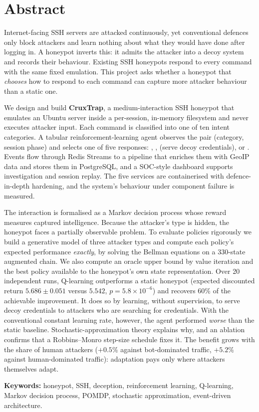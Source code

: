 \chapter*{Abstract}
Internet-facing SSH servers are attacked continuously, yet conventional defences only block
attackers and learn nothing about what they would have done after logging in. A honeypot
inverts this: it admits the attacker into a decoy system and records their behaviour.
Existing SSH honeypots respond to every command with the same fixed emulation. This project
asks whether a honeypot that \emph{chooses} how to respond to each command can capture more
attacker behaviour than a static one.

We design and build \textbf{CruxTrap}, a medium-interaction SSH honeypot that emulates an
Ubuntu server inside a per-session, in-memory filesystem and never executes attacker input.
Each command is classified into one of ten intent categories. A tabular reinforcement-learning
agent observes the pair (category, session phase) and selects one of five responses:
, ,  (serve decoy credentials),  or .
Events flow through Redis Streams to a pipeline that enriches them with GeoIP data and stores
them in PostgreSQL, and a SOC-style dashboard supports investigation and session replay.
The five services are containerised with defence-in-depth hardening, and the system's
behaviour under component failure is measured.

The interaction is formalised as a Markov decision process whose reward measures captured
intelligence. Because the attacker's type is hidden, the honeypot faces a partially
observable problem. To evaluate policies rigorously we build a generative model of three
attacker types and compute each policy's expected performance \emph{exactly}, by solving
the Bellman equations on a 330-state augmented chain. We also compute an oracle upper bound
by value iteration and the best policy available to the honeypot's own state representation.
Over 20 independent runs, Q-learning outperforms a static honeypot (expected discounted return
$5.686 \pm 0.051$ versus $5.542$, $p = 5.8 \times 10^{-6}$) and recovers 60\% of the achievable
improvement. It does so by learning, without supervision, to serve decoy credentials to attackers
who are searching for credentials. With the conventional constant learning rate, however, the
agent performed \emph{worse} than the static baseline. Stochastic-approximation theory explains
why, and an ablation confirms that a Robbins--Monro step-size schedule fixes it. The benefit
grows with the share of human attackers ($+0.5\%$ against bot-dominated traffic, $+5.2\%$
against human-dominated traffic): adaptation pays only where attackers themselves adapt.

\vspace{0.5em}
\noindent\textbf{Keywords:} honeypot, SSH, deception, reinforcement learning, Q-learning,
Markov decision process, POMDP, stochastic approximation, event-driven architecture.
